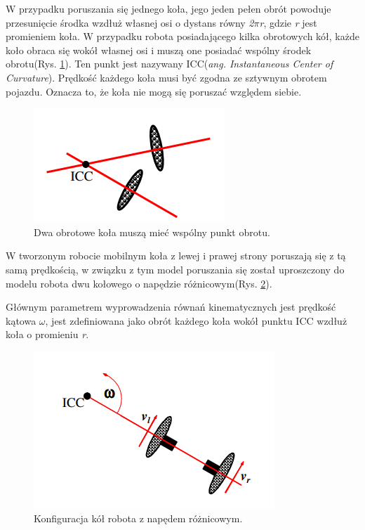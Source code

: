 W przypadku poruszania się jednego koła, jego jeden pełen obrót powoduje przesunięcie środka wzdłuż własnej osi o dystans równy \textit{2$\pi$r}, gdzie \textit{r} jest promieniem koła. W przypadku robota posiadającego kilka obrotowych kół, każde koło obraca się wokół własnej osi i muszą one posiadać wspólny środek obrotu(Rys. \ref{fig:diff_drive2}). Ten punkt jest nazywany ICC(\textit{ang. Instantaneous Center of Curvature}). Prędkość każdego koła musi być zgodna ze sztywnym obrotem pojazdu. Oznacza to, że koła nie mogą się poruszać względem siebie.
\begin{figure}[!h]
	\centering
	\includegraphics[scale=1]{diff_drive2.png}
	\caption{Dwa obrotowe koła muszą mieć wspólny punkt obrotu.}
	\label{fig:diff_drive2}
\end{figure}

W tworzonym robocie mobilnym koła z lewej i prawej strony poruszają się z tą samą prędkością, w związku z tym model poruszania się został uproszczony do modelu robota dwu kołowego o napędzie różnicowym(Rys. \ref{fig:diff_drive1}). 

Głównym parametrem wyprowadzenia równań kinematycznych jest prędkość kątowa $\omega$, jest zdefiniowana jako obrót każdego koła wokół punktu ICC wzdłuż koła o promieniu \textit{r}.


\begin{figure}[!h]
	\centering
	\includegraphics[scale=1]{diff_drive1.png}
	\caption{Konfiguracja kół robota z napędem różnicowym.}
	\label{fig:diff_drive1}
\end{figure}

